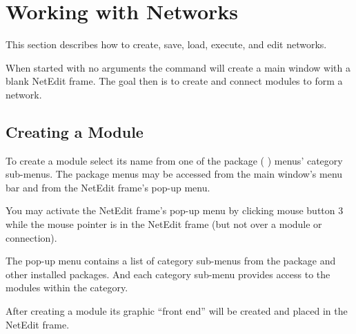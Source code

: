 %

  \newcommand{\modgraphic}%
  {\centerline{\epsfig{file=Figures/modgraphic-1.eps.gz,width=4in,
        bbllx=18, bblly=18, bburx=594, bbury=355}}}
\begin{htmlonly}
  \newcommand{\modgraphic}{%
  \htmladdimg[align=top,width="256",alt="SCIRun Module Graphic"]
  {../Figures/modgraphic-1.gif}}
\end{htmlonly}

  \newcommand{\moddialog}%
  {\centerline{\epsfig{file=Figures/moddialog.eps.gz,
        bbllx=0, bblly=0, bburx=201, bbury=282}}}
\begin{htmlonly}
  \newcommand{\moddialog}{%
  \htmladdimg[align=top,alt="SCIRun Module Dialog"]
  {../Figures/moddialog.jpg}}
\end{htmlonly}

\section{Working with Networks}
\label{sec:workwithnets}

This section describes how to create, save, load, execute, and edit
networks.

When started with no arguments the  command will create a
main window with a blank NetEdit frame.  The goal then is to create and
connect modules to form a network.


\subsection{Creating a Module}
\label{sec:creatingmodules}

To create a module select its name from one of the package (\eg{} \sr)
menus' category sub-menus.  The package menus may be accessed from the main
window's menu bar and from the NetEdit frame's pop-up menu.

You may activate the NetEdit frame's pop-up menu by clicking mouse button 3
while the mouse pointer is in the NetEdit frame (but not over a module or
connection).  

The pop-up menu contains a list of category sub-menus from the \sr{} package
and other installed packages.  And each category sub-menu provides
access to the modules within the category.

After creating a module its graphic ``front end'' will be created and
placed in the NetEdit frame.

